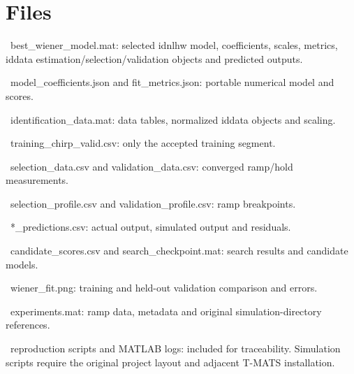 \section{Files}

\par\noindent\textbullet\ best\_\allowbreak wiener\_\allowbreak model.mat: selected idnlhw model, coefficients, scales, metrics,
iddata estimation/selection/validation objects and predicted outputs.
\par\noindent\textbullet\ model\_\allowbreak coefficients.json and fit\_\allowbreak metrics.json: portable numerical model and scores.
\par\noindent\textbullet\ identification\_\allowbreak data.mat: data tables, normalized iddata objects and scaling.
\par\noindent\textbullet\ training\_\allowbreak chirp\_\allowbreak valid.csv: only the accepted training segment.
\par\noindent\textbullet\ selection\_\allowbreak data.csv and validation\_\allowbreak data.csv: converged ramp/hold measurements.
\par\noindent\textbullet\ selection\_\allowbreak profile.csv and validation\_\allowbreak profile.csv: ramp breakpoints.
\par\noindent\textbullet\ *\_\allowbreak predictions.csv: actual output, simulated output and residuals.
\par\noindent\textbullet\ candidate\_\allowbreak scores.csv and search\_\allowbreak checkpoint.mat: search results and candidate models.
\par\noindent\textbullet\ wiener\_\allowbreak fit.png: training and held-out validation comparison and errors.
\par\noindent\textbullet\ experiments.mat: ramp data, metadata and original simulation-directory references.
\par\noindent\textbullet\ reproduction scripts and MATLAB logs: included for traceability. Simulation
scripts require the original project layout and adjacent T-MATS installation.
